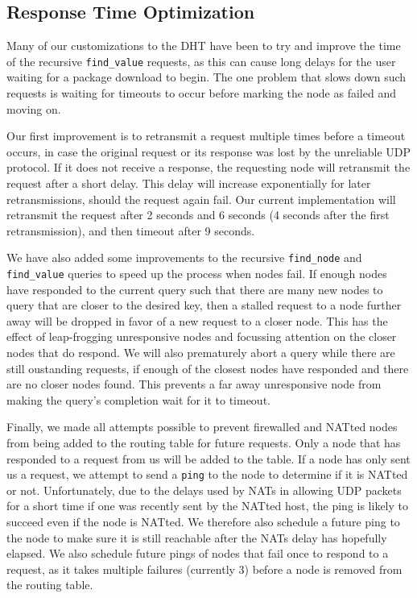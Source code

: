 \documentclass[conference]{IEEEtran}
\begin{document}
\subsection{Response Time Optimization}
\label{response_time}

Many of our customizations to the DHT have been to try and improve
the time of the recursive \texttt{find\_value} requests, as this can
cause long delays for the user waiting for a package download to
begin. The one problem that slows down such requests is waiting for
timeouts to occur before marking the node as failed and moving on.

Our first improvement is to retransmit a request multiple times
before a timeout occurs, in case the original request or its
response was lost by the unreliable UDP protocol. If it does not
receive a response, the requesting node will retransmit the request
after a short delay. This delay will increase exponentially for
later retransmissions, should the request again fail. Our current
implementation will retransmit the request after 2 seconds and 6
seconds (4 seconds after the first retransmission), and then timeout
after 9 seconds.

We have also added some improvements to the recursive
\texttt{find\_node} and \texttt{find\_value} queries to speed up the
process when nodes fail. If enough nodes have responded to the
current query such that there are many new nodes to query that are
closer to the desired key, then a stalled request to a node further
away will be dropped in favor of a new request to a closer node.
This has the effect of leap-frogging unresponsive nodes and
focussing attention on the closer nodes that do respond. We will also
prematurely abort a query while there are still oustanding requests,
if enough of the closest nodes have responded and there are no
closer nodes found. This prevents a far away unresponsive node from
making the query's completion wait for it to timeout.

Finally, we made all attempts possible to prevent firewalled and
NATted nodes from being added to the routing table for future
requests. Only a node that has responded to a request from us will
be added to the table. If a node has only sent us a request, we
attempt to send a \texttt{ping} to the node to determine if it is
NATted or not. Unfortunately, due to the delays used by NATs in
allowing UDP packets for a short time if one was recently sent by
the NATted host, the ping is likely to succeed even if the node is
NATted. We therefore also schedule a future ping to the node to make
sure it is still reachable after the NATs delay has hopefully
elapsed. We also schedule future pings of nodes that fail once to
respond to a request, as it takes multiple failures (currently 3)
before a node is removed from the routing table.
\end{document}
